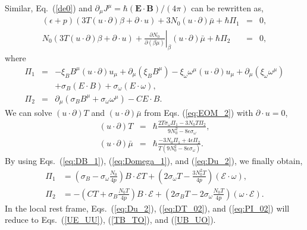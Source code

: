 \documentclass[aps,prd,showkeys,preprint,amsmath,amssymb,nofootinbib]{revtex4-1}
\begin{document}
Similar, Eq.~(\ref{de0}) and $\partial_{\mu}J^{\mu}=\hbar(\mathbf{E}\cdot\mathbf{B})/(4\pi)$
can be rewritten as, 
\begin{eqnarray}
(\epsilon+p)(3T(u\cdot\partial)\beta+\partial\cdot u)+3N_{0}(u\cdot\partial)\bar{\mu}+\hbar \Pi_{1} & = & 0,\nonumber \\
N_{0}(3T(u\cdot\partial)\beta+\partial\cdot u)+\left.\frac{\partial N_{0}}{\partial(\beta\mu)}\right|_{\beta}(u\cdot\partial)\bar{\mu}+\hbar \Pi_{2} & = & 0,\label{eq:EOM_2}
\end{eqnarray}
where
\begin{eqnarray}
\Pi_{1} & = & -\xi_{B}B^{\mu}(u\cdot\partial)u_{\mu}+\partial_{\mu}(\xi_{B}B^{\mu})-\xi_{\omega}\omega^{\mu}(u\cdot\partial)u_{\mu}+\partial_{\mu}(\xi_{\omega}\omega^{\mu})\nonumber \\
 &  & +\sigma_{B}(E\cdot B)+\sigma_{\omega}(E\cdot\omega),\nonumber \\
\Pi_{2} & = & \partial_{\mu}(\sigma_{B}B^{\mu}+\sigma_{\omega}\omega^{\mu})-CE\cdot B.
\end{eqnarray}
We can solve $(u\cdot\partial)T$ and $(u\cdot\partial)\bar{\mu}$
from Eqs. (\ref{eq:EOM_2}) with $\partial\cdot u=0$, 
\begin{eqnarray}
(u\cdot\partial)T & = & \hbar \frac{2T\sigma_{\omega}\Pi_{1}-3N_{0}T\Pi_{2}}{9N_{0}^{2}-8\epsilon\sigma_{\omega}},\nonumber \\
(u\cdot\partial)\bar{\mu} & = & \hbar \frac{-3N_{0}\Pi_{1}+4\epsilon\Pi_{2}}{T(9N_{0}^{2}-8\epsilon\sigma_{\omega})}.\label{eq:DT_02}
\end{eqnarray}
By using Eqs.~(\ref{eq:DB_1}), (\ref{eq:Domega_1}), and (\ref{eq:Du_2}),
we finally obtain, 
\begin{align}
\Pi_{1} & =(\sigma_{B}-\sigma_{\omega}\frac{N_{0}}{4p})B\cdot\mathcal{E}T+(2\sigma_{\omega}T-\frac{3N_{0}^{2}T}{4p})(\mathcal{E}\cdot\omega),\nonumber \\
\Pi_{2} & =-(CT+\sigma_{B}\frac{N_{0}T}{4p})B\cdot\mathcal{E}+(2\sigma_{B}T-2\sigma_{\omega}\frac{N_{0}T}{4p})(\omega\cdot\mathcal{E}).\label{eq:PI_02}
\end{align}
In the local rest frame, Eqs.~(\ref{eq:Du_2}), (\ref{eq:DT_02}), and (\ref{eq:PI_02})
will reduce to Eqs.~(\ref{UE_UU}), (\ref{TB_TO}), and (\ref{UB_UO}). 


\end{document}
